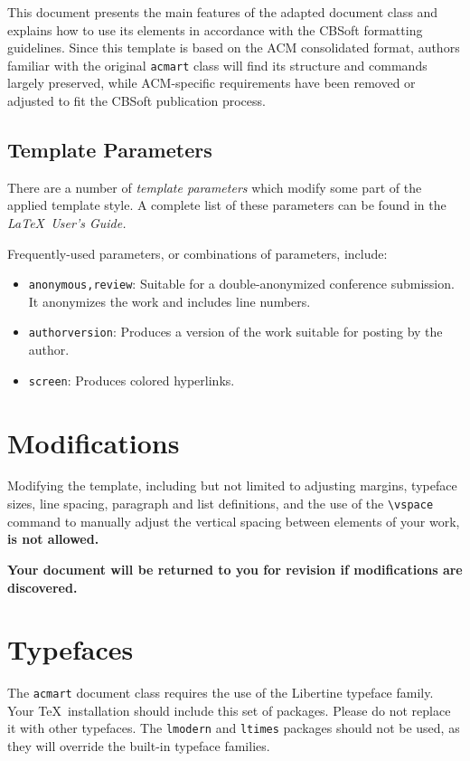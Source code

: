 \documentclass[sigconf]{acmart}
\begin{document}
This document presents the main features of the adapted document class and explains how to use its elements in accordance with the CBSoft formatting guidelines. Since this template is based on the ACM consolidated format, authors familiar with the original \verb|acmart| class will find its structure and commands largely preserved, while ACM-specific requirements have been removed or adjusted to fit the CBSoft publication process.

\subsection{Template Parameters}

There are a number of {\itshape template parameters}
which modify some part of the applied template style. A complete list
of these parameters can be found in the {\itshape \LaTeX\ User's Guide.}

Frequently-used parameters, or combinations of parameters, include:
\begin{itemize}
\item {\texttt{anonymous,review}}: Suitable for a double-anonymized conference submission. It anonymizes the work and includes line numbers.
\item{\texttt{authorversion}}: Produces a version of the work suitable for posting by the author.
\item{\texttt{screen}}: Produces colored hyperlinks.
\end{itemize}


\section{Modifications}

Modifying the template, including but not limited to adjusting
margins, typeface sizes, line spacing, paragraph and list definitions,
and the use of the \verb|\vspace| command to manually adjust the
vertical spacing between elements of your work, \textbf{is not allowed.}

\textbf{Your document will be returned to you for revision if modifications are discovered.}


\section{Typefaces}

The \verb|acmart| document class requires the use of the Libertine typeface family. Your \TeX\ installation should include this set of packages. Please do not replace it with other typefaces. The \verb|lmodern| and  \verb|ltimes| packages should not be used, as they will override the built-in typeface families.
\end{document}
